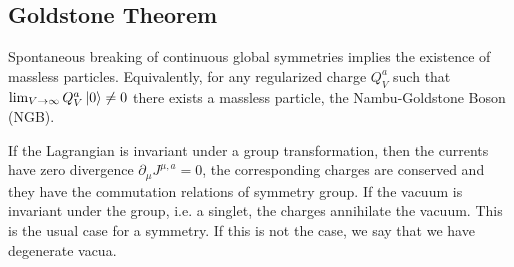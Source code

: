 \documentclass[../main.tex]{subfiles}
\begin{document}
\subsection{Goldstone Theorem}
\label{GT}
\begin{theorem}
Spontaneous breaking of continuous global symmetries implies the existence of massless particles. Equivalently, for any regularized charge $Q_V^a$ such that $\lim_{V\to\infty}Q_V^a\ket{0}\neq0$ there exists a massless particle, the Nambu-Goldstone Boson (NGB). 
\end{theorem}
If the Lagrangian is invariant under a group transformation, then the currents have zero divergence $\partial_\mu J^{\mu,a}=0$, the corresponding charges are conserved and they have the commutation relations of symmetry group. If the vacuum is invariant under the group, i.e. a singlet, the charges annihilate the vacuum. This is the usual case for a symmetry. If this is not the case, we say that we have degenerate vacua.
\end{document}
